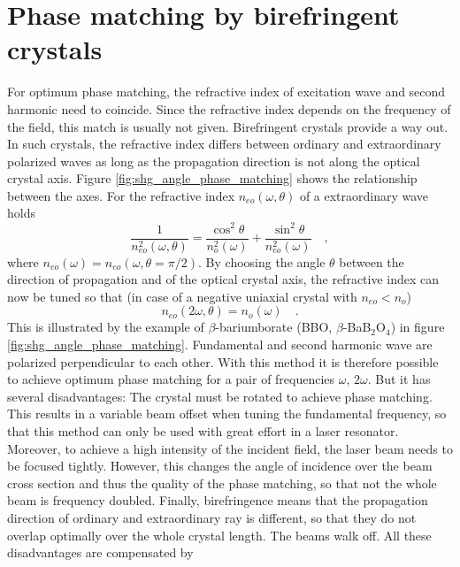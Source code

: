 \section{Phase matching by birefringent crystals}


For optimum phase matching, the refractive index of
excitation wave and second harmonic need to coincide. Since the
refractive index  depends on the frequency of the field, this
match is  usually not given. 
Birefringent crystals provide a way out. In such crystals, the refractive index differs  
 between ordinary and extraordinary
polarized waves as long as the propagation direction is not along the
optical crystal axis. Figure
\ref{fig:shg_angle_phase_matching} shows the relationship between
the axes. For the refractive index $n_{eo}(\omega, \theta)$ of a
extraordinary wave holds
\begin{equation}
  \frac{1}{n_{eo}^2(\omega, \theta)} = \frac{\cos^2
  \theta}{n_{o}^2(\omega)}+ \frac{\sin^2 \theta}{n_{eo}^2(\omega)} \quad
  , \label{eq:shg_neo}
\end{equation}
where $n_{eo}(\omega) = n_{eo}(\omega, \theta = \pi/2)$. 
By choosing the 
angle $\theta$ between the direction of propagation and
of the optical crystal axis, the refractive index can now be tuned
so that (in case of a negative uniaxial crystal with
$n_{eo} < n_o$)
\begin{equation}
  n_{eo}(2 \omega, \theta) = n_o(\omega) \quad.
\end{equation}
This is illustrated by the example of $\beta$-bariumborate (BBO,
$\beta$-BaB$_2$O$_4$) in figure
\ref{fig:shg_angle_phase_matching}. Fundamental  and
second harmonic  wave are polarized perpendicular to each other. With
this method it is therefore possible to achieve optimum phase matching for
a pair of frequencies $\omega$, $2\omega$. But it 
has several disadvantages: The crystal must be rotated
to achieve phase matching. This results in a variable beam
offset
when tuning the fundamental frequency, so that this method can only be used with great effort in a laser
resonator. Moreover, to achieve a high intensity of the incident field, the laser beam
needs to be focused tightly. However, this changes the angle of incidence over
the beam cross section and thus the quality of the
phase matching, so that not the whole beam is frequency doubled. Finally, birefringence means that the propagation direction of  ordinary and  extraordinary ray is different, so that they do not overlap optimally over the whole crystal length. The beams walk off.
All these disadvantages are compensated by
